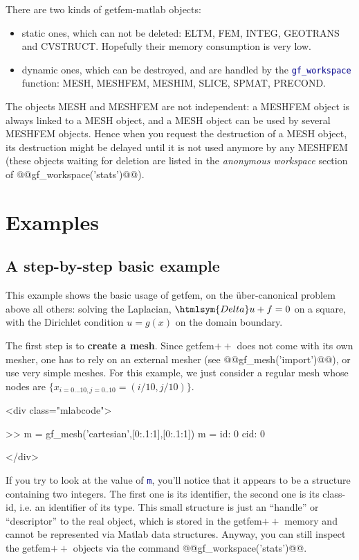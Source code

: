 \documentclass[11pt,a4paper]{article}
\newcommand{\sf}[1]{#1}
\newcommand{\Delta}{\htmlsym{Delta}}
\newcommand{\kw}[1]{\textcolor{darkblue}{\texttt{#1}}}
\newenvironment{matlab}{\begin{rawxml}<div class="mlabcode">\end{rawxml}\begin{example}}{\end{example}\begin{rawxml}</div>\end{rawxml}}
\newcommand{\kw}[1]{\textcolor{darkblue}{\texttt{#1}}}
\newenvironment{matlab}{\begin{alltt}}{\end{alltt}}
\newcommand{\Mlab}{{\sf Matlab\raisebox{4pt}{\tiny {\textregistered}}}\xspace}
\newcommand{\Mlab}{Matlab\xspace}
\newcommand{\gf}{{\sf getfem${++}$}\xspace}
\newcommand{\gfm}{{\sf getfem-matlab}\xspace}
\begin{document}
There are two kinds of \gfm objects:
\begin{itemize}
\item static ones, which can not be deleted: ELTM, FEM, INTEG,
  GEOTRANS and CVSTRUCT. Hopefully their memory consumption is very low.
\item dynamic ones, which can be destroyed, and are handled by the
  \kw{gf\_workspace} function: MESH, MESHFEM, MESHIM, SLICE, SPMAT, PRECOND.
\end{itemize}
The objects MESH and MESHFEM are not independent: a MESHFEM object is
always linked to a MESH object, and a MESH object can be used by
several MESHFEM objects. Hence when you request the destruction of a
MESH object, its destruction might be delayed until it is not used anymore
by any MESHFEM (these objects waiting for deletion are listed in
the \textit{anonymous workspace} section of
@@gf\_workspace('stats')@@).

\section{Examples}
\subsection{A step-by-step basic example}
This example shows the basic usage of getfem, on the {\"u}ber-canonical
problem above all others: solving the Laplacian, $\Delta u+f=0$ on a
square, with the Dirichlet condition $u=g(x)$ on the domain boundary.
\label{laplacianexample}

The first step is to \textbf{create a mesh}. Since \gf does not come with its
own mesher, one has to rely on an external mesher (see
@@gf_mesh('import')@@), or use very simple meshes.  For this example,
we just consider a regular mesh whose nodes are
$\{x_{i=0\ldots10,j=0..10}=(i/10,j/10)\}$.
\begin{matlab}
>> m = gf_mesh('cartesian',[0:.1:1],[0:.1:1])
m =
     id: 0
    cid: 0
\end{matlab}
If you try to look at the value of \kw{m}, you'll notice that it appears to be a structure
containing two integers. The first one is its identifier, the second one is its class-id, i.e. an identifier of its type. This small structure is 
just an ``handle'' or ``descriptor'' to the real object, which is
stored in the \gf memory and cannot be represented via \Mlab data
structures. Anyway, you can still inspect the \gf objects via the
command @@gf\_workspace('stats')@@. 
\end{document}
